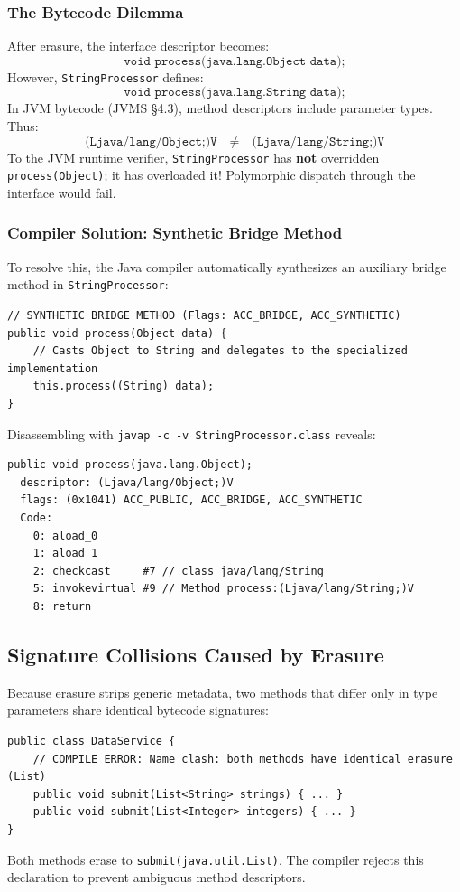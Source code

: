 \documentclass[10pt,journal,compsoc,onecolumn]{IEEEtran}
\begin{document}
\subsubsection{The Bytecode Dilemma}
After erasure, the interface descriptor becomes:
\begin{equation}
\texttt{void process(java.lang.Object data);}
\end{equation}
However, \texttt{StringProcessor} defines:
\begin{equation}
\texttt{void process(java.lang.String data);}
\end{equation}
In JVM bytecode (JVMS \S4.3), method descriptors include parameter types. Thus:
\begin{equation}
\texttt{(Ljava/lang/Object;)V} \quad \neq \quad \texttt{(Ljava/lang/String;)V}
\end{equation}
To the JVM runtime verifier, \texttt{StringProcessor} has \textbf{not} overridden \texttt{process(Object)}; it has overloaded it! Polymorphic dispatch through the interface would fail.

\subsubsection{Compiler Solution: Synthetic Bridge Method}
To resolve this, the Java compiler automatically synthesizes an auxiliary bridge method in \texttt{StringProcessor}:
\begin{lstlisting}[caption={Decompiled Synthetic Bridge Method Generated by javac}]
// SYNTHETIC BRIDGE METHOD (Flags: ACC_BRIDGE, ACC_SYNTHETIC)
public void process(Object data) {
    // Casts Object to String and delegates to the specialized implementation
    this.process((String) data);
}
\end{lstlisting}
Disassembling with \texttt{javap -c -v StringProcessor.class} reveals:
\begin{verbatim}
public void process(java.lang.Object);
  descriptor: (Ljava/lang/Object;)V
  flags: (0x1041) ACC_PUBLIC, ACC_BRIDGE, ACC_SYNTHETIC
  Code:
    0: aload_0
    1: aload_1
    2: checkcast     #7 // class java/lang/String
    5: invokevirtual #9 // Method process:(Ljava/lang/String;)V
    8: return
\end{verbatim}

\subsection{Signature Collisions Caused by Erasure}
Because erasure strips generic metadata, two methods that differ only in type parameters share identical bytecode signatures:
\begin{lstlisting}
public class DataService {
    // COMPILE ERROR: Name clash: both methods have identical erasure (List)
    public void submit(List<String> strings) { ... }
    public void submit(List<Integer> integers) { ... }
}
\end{lstlisting}
Both methods erase to \texttt{submit(java.util.List)}. The compiler rejects this declaration to prevent ambiguous method descriptors.
\end{document}
